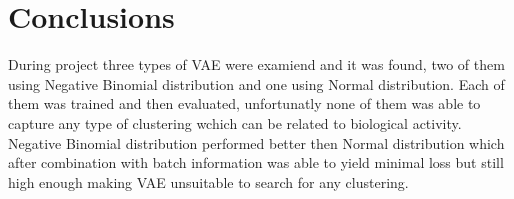 \documentclass[12pt,a4paper]{article}
\begin{document}
\section{Conclusions}
During project three types of VAE were examiend and it was found, two of them  using Negative Binomial distribution and one using Normal distribution. Each of them
was trained and then evaluated, unfortunatly none of them was able to capture any type of clustering wchich can be related to biological activity.
Negative Binomial distribution performed better then Normal distribution which after combination with batch information was able to yield minimal loss but still
high enough making VAE unsuitable to search for any clustering. 
\end{document}
